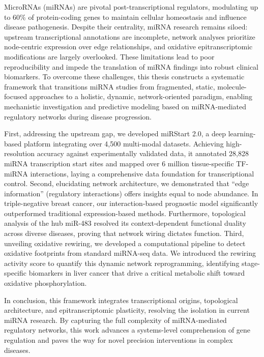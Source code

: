 
MicroRNAs (miRNAs) are pivotal post-transcriptional regulators, modulating up to 60\% of protein-coding genes to maintain cellular homeostasis and influence disease pathogenesis. Despite their centrality, miRNA research remains siloed: upstream transcriptional annotations are incomplete, network analyses prioritize node-centric expression over edge relationships, and oxidative epitranscriptomic modifications are largely overlooked. These limitations lead to poor reproducibility and impede the translation of miRNA findings into robust clinical biomarkers. To overcome these challenges, this thesis constructs a systematic framework that transitions miRNA studies from fragmented, static, molecule-focused approaches to a holistic, dynamic, network-oriented paradigm, enabling mechanistic investigation and predictive modeling based on miRNA-mediated regulatory networks during disease progression.

First, addressing the upstream gap, we developed miRStart 2.0, a deep learning-based platform integrating over 4,500 multi-modal datasets. Achieving high-resolution accuracy against experimentally validated data, it annotated 28,828 miRNA transcription start sites and mapped over 6 million tissue-specific TF-miRNA interactions, laying a comprehensive data foundation for transcriptional control. Second, elucidating network architecture, we demonstrated that ``edge information'' (regulatory interactions) offers insights equal to node abundance. In triple-negative breast cancer, our interaction-based prognostic model significantly outperformed traditional expression-based methods. Furthermore, topological analysis of the hub miR-483 resolved its context-dependent functional duality across diverse diseases, proving that network wiring dictates function. Third, unveiling oxidative rewiring, we developed a computational pipeline to detect oxidative footprints from standard miRNA-seq data. We introduced the rewiring activity score to quantify this dynamic network reprogramming, identifying stage-specific biomarkers in liver cancer that drive a critical metabolic shift toward oxidative phosphorylation.

In conclusion, this framework integrates transcriptional origins, topological architecture, and epitranscriptomic plasticity, resolving the isolation in current miRNA research. By capturing the full complexity of miRNA-mediated regulatory networks, this work advances a systems-level comprehension of gene regulation and paves the way for novel precision interventions in complex diseases.
